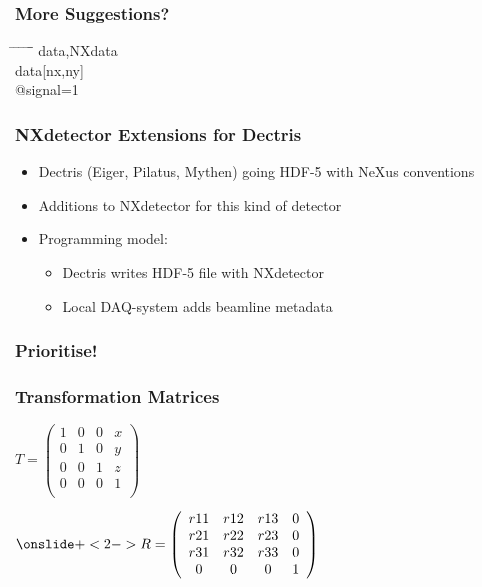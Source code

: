 \documentclass{beamer}
\begin{document}
\begin{frame} \frametitle{More Suggestions?}
\begin{tabbing}
\hspace*{1cm} \= \hspace*{1cm} \= \hspace*{1cm} \= \hspace*{1cm} \= \hspace*{1cm} \= \hspace*{1cm}\= \kill
\>data,NXdata\\
\> \>data[nx,ny]\\
\> \> \>@signal=1 \\
\end{tabbing}
\end{frame}

\begin{frame}
\frametitle{NXdetector Extensions for Dectris}
\begin{itemize}
\item Dectris (Eiger, Pilatus, Mythen) going HDF-5 with NeXus conventions
\item Additions to NXdetector for this kind of detector
\item Programming model:
\begin{itemize}
\item Dectris writes HDF-5 file with NXdetector
\item Local DAQ-system adds beamline metadata   
\end{itemize}
\end{itemize}
\end{frame}




\begin{frame} \frametitle{Prioritise!}
\end{frame}














\begin{frame} \frametitle{Transformation Matrices}
\begin{math}
T = \left( \begin{array}{cccc}
1 & 0 & 0 & x\\
0 & 1 & 0 & y\\
0 & 0 & 1 & z\\
0 & 0 & 0 & 1\\
\end{array} \right)
\end{math}

\begin{math}
\onslide+<2-> 
R = \left( \begin{array}{cccc}
r11 & r12 & r13 & 0\\
r21 & r22 & r23 & 0\\
r31 & r32 & r33 & 0\\
0 & 0 & 0 & 1\\
\end{array} \right)
\end{math}

\end{frame}
\end{document}
